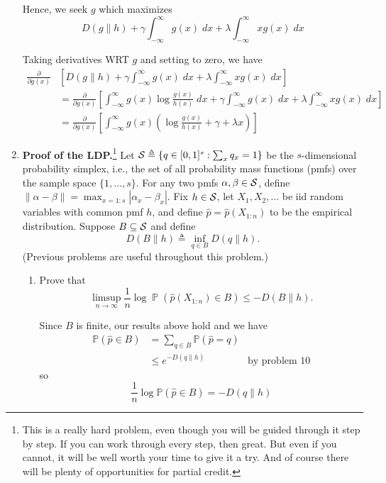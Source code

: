 \documentclass[12pt]{article}
\renewcommand{\hat}[1]{\widehat{#1}}
\renewcommand{\P}{\mathbb{P}}
\DeclareMathOperator{\Prob}{\mathbb{P}}
\begin{document}
\begin{enumerate}[1.]
	      Hence, we seek $g$ which maximizes
	      \[D(g \| h) + \gamma \int_{-\infty}^{\infty} g(x)\; dx + \lambda \int_{-\infty}^{\infty} xg(x)\; dx\]

	      Taking derivatives WRT $g$ and setting to zero, we have
	      \begin{align*}
		      \frac{\partial}{\partial g(x)} & \left[D(g \| h) + \gamma \int_{-\infty}^{\infty} g(x)\; dx + \lambda \int_{-\infty}^{\infty} xg(x)\; dx\right]                                                                                 \\
		                                     & = \frac{\partial}{\partial g(x)} \left[\int_{-\infty}^{\infty} g(x) \log \frac{g(x)}{h(x)}\; dx + \gamma \int_{-\infty}^{\infty} g(x)\; dx + \lambda \int_{-\infty}^{\infty} xg(x)\; dx\right] \\
		                                     & = \frac{\partial}{\partial g(x)} \left[\int_{-\infty}^{\infty} g(x)\left(\log \frac{g(x)}{h(x)} + \gamma + \lambda x\right) \right]
	      \end{align*}
	      \color{black}



	      \pagebreak

	\item {\bf Proof of the LDP.}\footnote{This is a really hard problem, even though you will be guided through it step by step. If you can work through every step, then great. But even if you cannot, it will be well worth your time to give it a try. And of course there will be plenty of opportunities for partial credit.} Let ${\cal S} \triangleq \{q\in[0,1]^s : \sum_x q_x = 1\}$ be the $s$-dimensional probability simplex, i.e., the set of all probability mass functions (pmfs) over the sample space $\{1,\dotsc,s\}$.
	      For any two pmfs $\alpha,\beta \in {\cal S}$, define $\|\alpha - \beta \| = \max_{x=1:s} |\alpha_x - \beta_x |$.
	      Fix $h\in {\cal S}$, let $X_1,X_2,\dotsc$ be iid random variables with common pmf $h$, and define $\widehat p = \widehat p(X_{1:n})$ to be the empirical distribution.  Suppose $B\subseteq{\cal S}$ and define
	      \[ D(B\|h) \triangleq \inf_{q\in B} D(q\|h) . \]
	      (Previous problems are useful throughout this problem.)
	      \begin{enumerate}

		      \item Prove that \[ \limsup_{n\to\infty} \frac{1}{n} \log \Prob(\widehat p(X_{1:n}) \in B) \leq -D(B\|h) . \]

		            \color{blue}
		            Since $B$ is finite, our results above hold and we have
		            \begin{align*}
			            \P(\hat p \in B) & = \sum_{q \in B} \P(\hat p = q)                        \\
			                             & \leq e^{-D(q \| h)}             & \text{by problem 10}
		            \end{align*}
		            so
		            \[\frac{1}{n} \log \P(\hat p \in B) = -D(q \| h)\]


\end{enumerate}
\end{enumerate}
\end{document}
